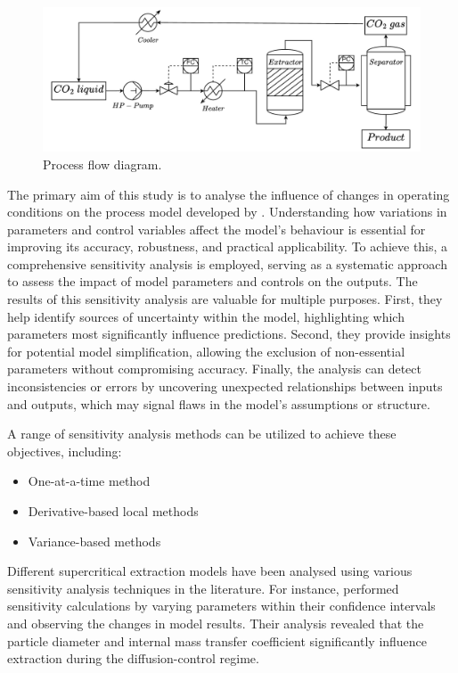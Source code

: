 \documentclass[a4paper,fleqn]{cas-dc}
\begin{document}
	\begin{figure}[h!]
		\centering
		\includegraphics[width=\columnwidth]{Figures/PFD.drawio.pdf}
		\caption{Process flow diagram.}
		\label{fig: SFE_drawing}
	\end{figure}
	
	The primary aim of this study is to analyse the influence of changes in operating conditions on the process model developed by \citet{Sliczniuk2024}. Understanding how variations in parameters and control variables affect the model's behaviour is essential for improving its accuracy, robustness, and practical applicability. To achieve this, a comprehensive sensitivity analysis is employed, serving as a systematic approach to assess the impact of model parameters and controls on the outputs. The results of this sensitivity analysis are valuable for multiple purposes. First, they help identify sources of uncertainty within the model, highlighting which parameters most significantly influence predictions. Second, they provide insights for potential model simplification, allowing the exclusion of non-essential parameters without compromising accuracy. Finally, the analysis can detect inconsistencies or errors by uncovering unexpected relationships between inputs and outputs, which may signal flaws in the model's assumptions or structure.
	
	A range of sensitivity analysis methods can be utilized to achieve these objectives, including:
	
	\begin{itemize}
		\item One-at-a-time method
		\item Derivative-based local methods
		\item Variance-based methods
	\end{itemize}
	
	Different supercritical extraction models have been analysed using various sensitivity analysis techniques in the literature. For instance, \citet{Fiori_2007} performed sensitivity calculations by varying parameters within their confidence intervals and observing the changes in model results. Their analysis revealed that the particle diameter and internal mass transfer coefficient significantly influence extraction during the diffusion-control regime.
	
\end{document}
